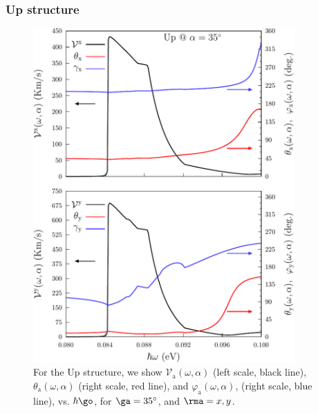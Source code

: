 \documentclass[floatfix,prb,aps,superscriptaddress,showpacs,11pt,preprint,letterpaper]{revtex4}
\def\tama{10cm}
\begin{document}
\subsubsection{Up structure}

\begin{figure}[t]
\centering
\includegraphics[width=\tama]{upplots/up-vx-vy-w1}
\caption{For the Up structure, we show
$\mathcal{V}_{\mathrm{a}} (\omega,\alpha)$
(left scale, black line),  
$\theta_{\mathrm{a}} (\omega,\alpha)$
(right scale, red line), and
$\varphi_{\mathrm{a}} (\omega,\alpha)$,
(right scale, blue line),
vs. $\hbar\go$, for $\ga=35^\circ$, 
and $\rma=x,y$.
}
\label{fig:up-vab-comp-rtp-1}
\end{figure}
\end{document}

